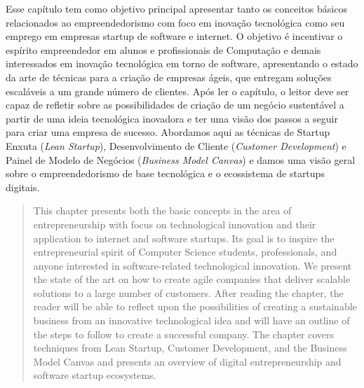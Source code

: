 \begin{resumo}
Esse capítulo tem como objetivo principal apresentar tanto os conceitos básicos relacionados ao empreendedorismo com foco em inovação tecnológica como seu emprego em empresas startup de software e internet. O objetivo é incentivar o espírito empreendedor em alunos e profissionais de Computação e demais interessados em inovação tecnológica em torno de software, apresentando o estado da arte de técnicas para a criação de empresas ágeis, que entregam soluções escaláveis a um grande número de clientes. Após ler o capítulo, o leitor deve ser capaz de refletir sobre as possibilidades de criação de um negócio sustentável a partir de uma ideia tecnológica inovadora e ter uma visão dos passos a seguir para criar uma empresa de sucesso. Abordamos aqui as técnicas de Startup Enxuta (\emph{Lean Startup}), Desenvolvimento de Cliente (\emph{Customer Development}) e Painel de Modelo de Negócios (\emph{Business Model Canvas}) e damos uma visão geral sobre o empreendedorismo de base tecnológica e o ecossistema de startups digitais.

\end{resumo}

\begin{abstract}
This chapter presents both the basic concepts in the area of entrepreneurship with focus on technological innovation and their application to internet and software startups. Its goal is to inspire the entrepreneurial spirit of Computer Science students, professionals, and anyone interested in software-related technological innovation. We present the state of the art on how to create agile companies that deliver scalable solutions to a large number of customers. After reading the chapter, the reader will be able to reflect upon the possibilities of creating a sustainable business from an innovative technological idea and will have an outline of the steps to follow to create a successful company. The chapter covers techniques from Lean Startup, Customer Development, and the Business Model Canvas and presents an overview of digital entrepreneurship and software startup ecosystems.

\end{abstract}
